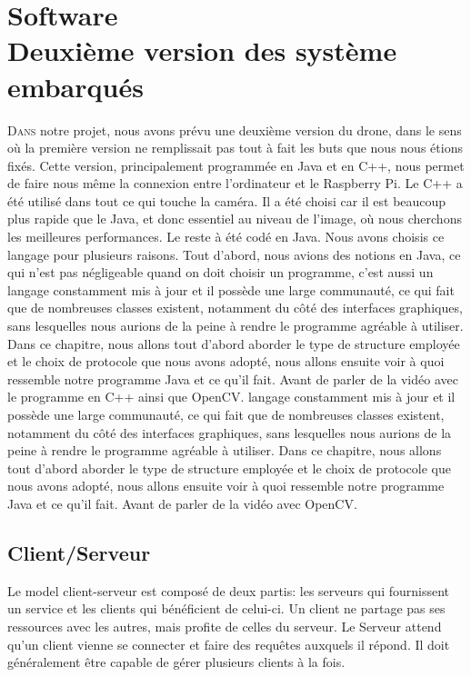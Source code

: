 \documentclass[a4paper,11pt]{report}
\begin{document}
{\clearpage

\chapter{Software \\ Deuxième version des système embarqués}

\lettrine{D}{ans} notre projet, nous avons prévu une deuxième version du drone, 
dans le sens où la première version ne remplissait pas tout à fait les buts que nous 
nous étions fixés. Cette version, principalement programmée en Java et en C++, 
nous permet de faire nous même la connexion entre l'ordinateur et le Raspberry Pi. Le C++ a été utilisé dans tout ce qui touche la caméra. Il a été choisi car il est beaucoup plus rapide que le Java, et donc essentiel au niveau de l'image, où nous cherchons les meilleures performances. Le reste à été codé en Java. Nous avons choisis ce langage pour plusieurs raisons. Tout d'abord, nous avions des notions en Java, 
ce qui n'est pas négligeable quand on doit choisir un programme, c'est aussi un langage constamment mis à jour et il possède une large communauté, ce qui fait que de nombreuses classes existent, notamment du côté des interfaces graphiques,
sans lesquelles nous aurions de la peine à rendre le programme agréable à utiliser. Dans ce chapitre, nous allons tout d'abord aborder le type de structure employée et le choix de protocole
que nous avons adopté, nous allons ensuite voir à quoi ressemble notre programme Java et ce qu'il fait. Avant de parler
de la vidéo avec le programme en C++ ainsi que OpenCV.
langage constamment mis à jour et il possède une large communauté, ce qui fait
que de nombreuses classes existent, notamment du côté des interfaces graphiques,
sans lesquelles nous aurions de la peine à rendre le programme agréable à 
utiliser. Dans ce chapitre, nous allons tout d'abord aborder le type de structure employée et le choix de protocole
que nous avons adopté, nous allons ensuite voir à 
quoi ressemble notre programme Java et ce qu'il fait. Avant de parler
de la vidéo avec OpenCV. 


\section{Client/Serveur\label{ClientServeur}}
Le model client-serveur est composé de deux partis: les serveurs qui fournissent un service et les clients qui bénéficient de celui-ci. Un client ne partage pas ses ressources avec les autres, mais profite de celles du serveur. Le Serveur attend qu'un client vienne se connecter et faire des requêtes auxquels il répond. Il doit généralement être capable de gérer plusieurs clients à la fois.

}
\end{document}
